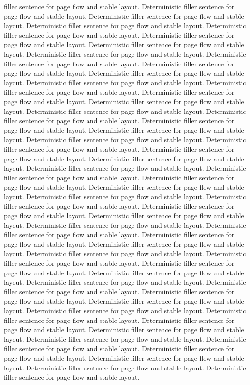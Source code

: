\documentclass{article}
\begin{document}
filler sentence for page flow and stable layout. Deterministic filler sentence for page flow and stable layout. Deterministic filler sentence for page flow and stable layout. Deterministic filler sentence for page flow and stable layout. Deterministic filler sentence for page flow and stable layout. Deterministic filler sentence for page flow and stable layout. Deterministic filler sentence for page flow and stable layout. Deterministic filler sentence for page flow and stable layout. Deterministic filler sentence for page flow and stable layout. Deterministic filler sentence for page flow and stable layout. Deterministic filler sentence for page flow and stable layout. Deterministic filler sentence for page flow and stable layout. Deterministic filler sentence for page flow and stable layout. Deterministic filler sentence for page flow and stable layout. Deterministic filler sentence for page flow and stable layout. Deterministic filler sentence for page flow and stable layout. Deterministic filler sentence for page flow and stable layout. Deterministic filler sentence for page flow and stable layout. Deterministic filler sentence for page flow and stable layout. Deterministic filler sentence for page flow and stable layout. Deterministic filler sentence for page flow and stable layout. Deterministic filler sentence for page flow and stable layout. Deterministic filler sentence for page flow and stable layout. Deterministic filler sentence for page flow and stable layout. Deterministic filler sentence for page flow and stable layout. Deterministic filler sentence for page flow and stable layout. Deterministic filler sentence for page flow and stable layout. Deterministic filler sentence for page flow and stable layout. Deterministic filler sentence for page flow and stable layout. Deterministic filler sentence for page flow and stable layout. Deterministic filler sentence for page flow and stable layout. Deterministic filler sentence for page flow and stable layout. Deterministic filler sentence for page flow and stable layout. Deterministic filler sentence for page flow and stable layout. Deterministic filler sentence for page flow and stable layout. Deterministic filler sentence for page flow and stable layout. Deterministic filler sentence for page flow and stable layout. Deterministic filler sentence for page flow and stable layout. Deterministic filler sentence for page flow and stable layout. Deterministic filler sentence for page flow and stable layout. Deterministic filler sentence for page flow and stable layout. Deterministic filler sentence for page flow and stable layout. Deterministic filler sentence for page flow and stable layout. Deterministic filler sentence for page flow and stable layout. Deterministic filler sentence for page flow and stable layout. Deterministic filler sentence for page flow and stable layout. Deterministic filler sentence for page flow and stable layout. Deterministic filler sentence for page flow and stable layout. Deterministic filler sentence for page flow and stable layout. Deterministic filler sentence for page flow and stable layout. Deterministic filler sentence for page flow and stable layout. Deterministic filler sentence for page flow and stable layout. Deterministic filler sentence for page flow and stable layout. 
\end{document}
